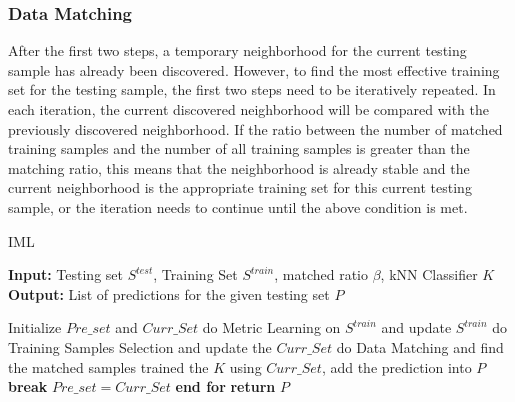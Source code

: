 \subsubsection{Data Matching}
After the first two steps, a temporary neighborhood for the current testing sample has already been discovered. However, to find the most effective training set for the testing sample, the first two steps need to be iteratively repeated. In each iteration, the current discovered neighborhood will be compared with the previously discovered neighborhood. If the ratio between the number of matched training samples and the number of all training samples is greater than the matching ratio, this means that the neighborhood is already stable and the current neighborhood is the appropriate training set for this current testing sample, or the iteration needs to continue until the above condition is met.
\begin{algorithm}[h]
    \caption{IML}
    \label{algo4}
    \hspace*{0.02in} {\bf Input:} Testing set $S^{test}$, Training Set $S^{train}$, matched ratio $\beta$, kNN Classifier $K$\\
    \hspace*{0.02in} {\bf Output:} List of predictions for the given testing set $P$
    \begin{algorithmic}[1]
            \State Initialize $Pre\_set$ and $Curr\_Set$
                \State do Metric Learning on $S^{train}$ and update $S^{train}$
                \State do Training Samples Selection and update the $Curr\_Set$
                \State do Data Matching and find the matched samples
                    \State trained the $K$ using $Curr\_Set$, add the prediction into $P$
                    \State \textbf{break}
                    \Else\State $Pre\_set = Curr\_Set$
                \EndIf
            \EndWhile
        \EndFor
        \State \textbf{end for}
        \State \textbf{return} $P$
    \end{algorithmic}
\end{algorithm}